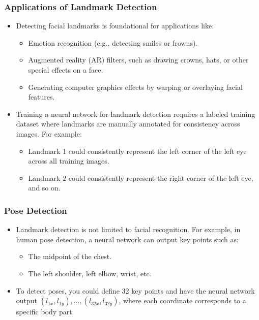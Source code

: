 \documentclass[letterpaper,12pt,notitlepage,twoside]{report}
\begin{document}
\subsubsection*{Applications of Landmark Detection}
\begin{itemize}
    \item Detecting facial landmarks is foundational for applications like:
    \begin{itemize}
        \item Emotion recognition (e.g., detecting smiles or frowns).
        \item Augmented reality (AR) filters, such as drawing crowns, hats, or other special effects on a face.
        \item Generating computer graphics effects by warping or overlaying facial features.
    \end{itemize}
    \item Training a neural network for landmark detection requires a labeled training dataset where landmarks are manually annotated for consistency across images. For example:
    \begin{itemize}
        \item Landmark \(1\) could consistently represent the left corner of the left eye across all training images.
        \item Landmark \(2\) could consistently represent the right corner of the left eye, and so on.
    \end{itemize}
\end{itemize}

\subsubsection*{Pose Detection}
\begin{itemize}
    \item Landmark detection is not limited to facial recognition. For example, in human pose detection, a neural network can output key points such as:
    \begin{itemize}
        \item The midpoint of the chest.
        \item The left shoulder, left elbow, wrist, etc.
    \end{itemize}
    \item To detect poses, you could define 32 key points and have the neural network output \((l_{1x}, l_{1y}), \dots, (l_{32x}, l_{32y})\), where each coordinate corresponds to a specific body part.
\end{itemize}
\end{document}
